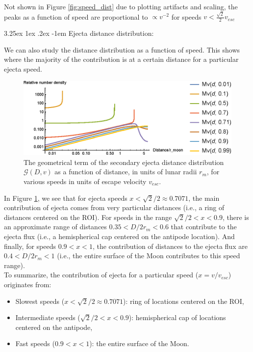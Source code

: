 \documentclass{hitec}
\makeatletter
\numberwithin{equation}{section}
\renewcommand\paragraph{\@startsection{paragraph}{5}{\z@}%
	{3.25ex \@plus1ex \@minus.2ex}%
	{-1em}%
	{\normalfont\normalsize\bfseries}}
\makeatother
\begin{document}
Not shown in Figure \ref{fig:speed_dist} due to plotting artifacts and scaling, the peaks as a function of speed are proportional to $\propto v^{-2}$ for speeds $v < \frac{\sqrt{2}}{2}v_{esc}$

\paragraph{Ejecta distance distribution:}

We can also study the distance distribution as a function of speed. This shows where the majority of the contribution is at a certain distance for a particular ejecta speed.


\begin{figure}[h!]
	\centering
	\includegraphics[width=1\textwidth]{speed_dist_2.eps}
	\caption{The geometrical term of the secondary ejecta distance distribution $\mathcal{G}(D,v)$ as a function of distance, in units of lunar radii $r_m$, for various speeds in units of escape velocity $v_{esc}$.}\label{fig:speed_dist2}
\end{figure}

In Figure \ref{fig:speed_dist2}, we see that for ejecta speeds $x < \sqrt{2}/2 \approx 0.7071$, the main contribution of ejecta comes from very particular distances (i.e., a ring of distances centered on the ROI). For speeds in the range $\sqrt{2}/2 < x < 0.9$, there is an approximate range of distances $0.35 < D/2r_m < 0.6$ that contribute to the ejecta flux (i.e., a hemispherical cap centered on the antipode location). And finally, for speeds $ 0.9 < x < 1$, the contribution of distances to the ejecta flux are $0.4 < D/2r_m < 1$ (i.e., the entire surface of the Moon contributes to this speed range).\\

To summarize, the contribution of ejecta for a particular speed ($x = v / v_{esc}$) originates from:
\begin{itemize}
	\item Slowest speeds ($x < \sqrt{2}/2 \approx 0.7071$): ring of locations centered on the ROI,
	\item Intermediate speeds ($\sqrt{2}/2 < x < 0.9$): hemispherical cap of locations centered on the antipode,
	\item Fast speeds ($ 0.9 < x < 1$): the entire surface of the Moon.
\end{itemize}
\end{document}
